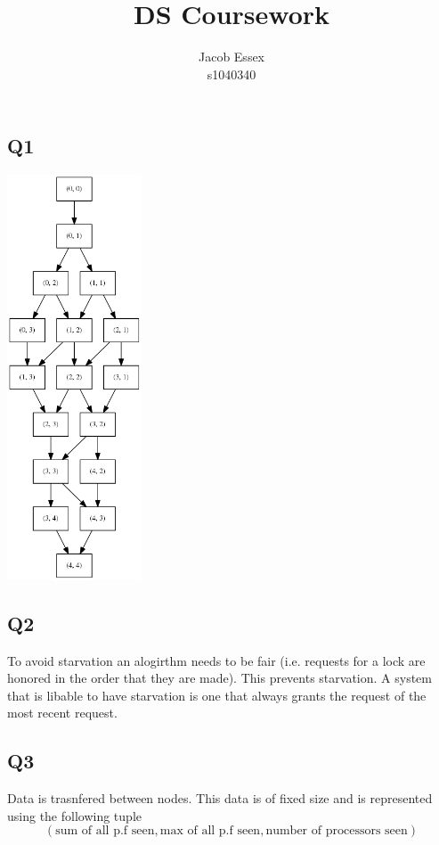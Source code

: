 \documentclass[11pt]{article}
\begin{document}
\title{DS Coursework}
\author{Jacob Essex \\ s1040340}
\maketitle

\subsection*{Q1}

\includegraphics[width=0.3\textwidth]{q1_theory.png}


\subsection*{Q2}
To avoid starvation an alogirthm needs to be fair (i.e. requests for a lock are honored in the order that they are made). This prevents starvation. A system that is libable to have starvation is one that always grants the request of the most recent request.

\subsection*{Q3}

Data is trasnfered between nodes. This data is of fixed size and is represented using the following tuple
$$
(\text{sum of all p.f seen}, \text{max of all p.f seen}, \text{number of processors seen})
$$
\end{document}

